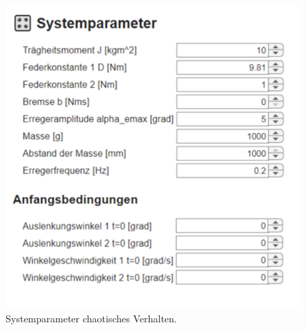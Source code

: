         \begin{figure}[htbp]
            \centering
            \includegraphics[height=.35\textheight]{Bilder/Kapitel-3/Systemparameter Chaotisches Verhalten.png}
            \caption[Systemparameter für chaotisches Verhalten]{Systemparameter chaotisches Verhalten.}\label{Systemparameter Chaotisches Verhalten}
        \end{figure}